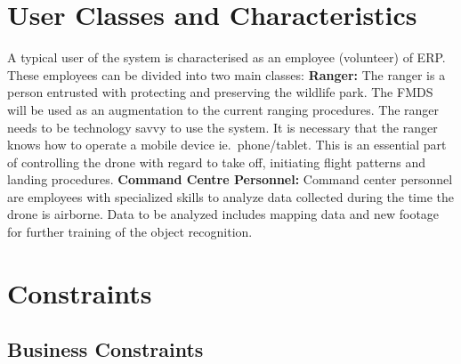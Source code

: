 \section{User Classes and Characteristics}

\begin{flushleft}
	A typical user of the system is characterised as an employee (volunteer) of ERP. 
	These employees can be divided into two main classes:
	\newline
	\newline
	\textbf{Ranger:}
	\newline
	The ranger is a person entrusted with protecting and preserving the wildlife park. 
	The FMDS will be used as an augmentation to the current ranging procedures. 
	The ranger needs to be technology savvy to use the system.
	It is necessary that the ranger knows how to operate a mobile device ie.\ phone/tablet.
	This is an essential part of controlling the drone with regard to take off, initiating flight patterns and landing procedures.
	\newline
	\newline
	\textbf{Command Centre Personnel:}
	\newline
	Command center personnel are employees with specialized skills to analyze data collected during the time the drone is airborne. 
	Data to be analyzed includes mapping data and new footage for further training of the object recognition.
	
	
\end{flushleft}

\section{Constraints}
	\subsection{Business Constraints}
		\begin{flushleft}
		\end{flushleft}
